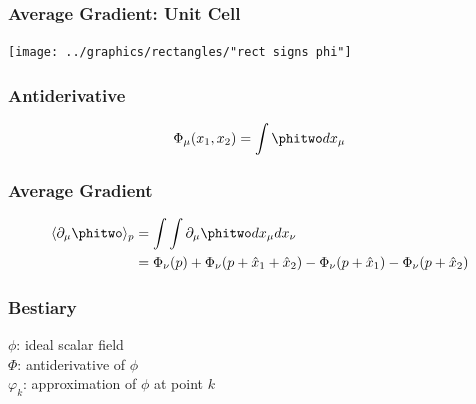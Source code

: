 \documentclass[]{beamer}
\begin{document}
\begin{frame}
  \frametitle{Average Gradient: Unit Cell}  %
  \begin{center}
    \texttt{[image: ../graphics/rectangles/"rect signs phi"]}
  \end{center}
\end{frame}

\begin{frame}
  \frametitle{Antiderivative}  %
  $$\Phi_{\mu}(x_{1}, x_{2}) = \int \phitwo dx_{\mu}$$
\end{frame}

\begin{frame}
  \frametitle{Average Gradient}  %
\begin{equation*}
  \begin{split}
    \langle \partial_{\mu} \phitwo \rangle_{p} 
      &= \int \int \partial_{\mu} \phitwo dx_{\mu} dx_{\nu} \\
      &= \Phi_{\nu}(p) + \Phi_{\nu}(p + \hat{x}_{1} + \hat{x}_{2}) - \Phi_{\nu}(p + \hat{x}_{1}) - \Phi_{\nu}(p + \hat{x}_{2})
  \end{split}
\end{equation*}
\end{frame}

\begin{frame}
  \frametitle{Bestiary}  %
  $\phi$: ideal scalar field  \\ [15pt]
  $\Phi$: antiderivative of $\phi$ \\[15pt]
  $\varphi_{k}$: approximation of $\phi$ at point $k$ 
\end{frame}
\end{document}
